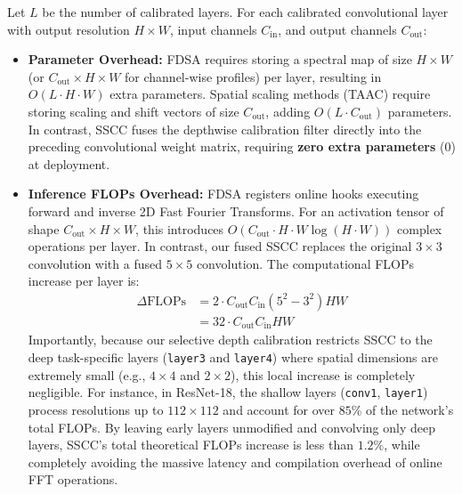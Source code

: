 \documentclass{article}
\theoremstyle{plain}
\theoremstyle{definition}
\theoremstyle{remark}
\begin{document}
Let $L$ be the number of calibrated layers. For each calibrated convolutional layer with output resolution $H \times W$, input channels $C_{\text{in}}$, and output channels $C_{\text{out}}$:
\begin{itemize}
    \item \textbf{Parameter Overhead:} FDSA requires storing a spectral map of size $H \times W$ (or $C_{\text{out}} \times H \times W$ for channel-wise profiles) per layer, resulting in $O(L \cdot H \cdot W)$ extra parameters. Spatial scaling methods (TAAC) require storing scaling and shift vectors of size $C_{\text{out}}$, adding $O(L \cdot C_{\text{out}})$ parameters. In contrast, SSCC fuses the depthwise calibration filter directly into the preceding convolutional weight matrix, requiring \textbf{zero extra parameters} ($0$) at deployment.
    \item \textbf{Inference FLOPs Overhead:} FDSA registers online hooks executing forward and inverse 2D Fast Fourier Transforms. For an activation tensor of shape $C_{\text{out}} \times H \times W$, this introduces $O(C_{\text{out}} \cdot H \cdot W \log(H \cdot W))$ complex operations per layer. In contrast, our fused SSCC replaces the original $3 \times 3$ convolution with a fused $5 \times 5$ convolution. The computational FLOPs increase per layer is:
    \begin{align}
        \Delta \text{FLOPs} &= 2 \cdot C_{\text{out}} C_{\text{in}} (5^2 - 3^2) H W \nonumber \\
        &= 32 \cdot C_{\text{out}} C_{\text{in}} H W
    \end{align}
    Importantly, because our selective depth calibration restricts SSCC to the deep task-specific layers (\texttt{layer3} and \texttt{layer4}) where spatial dimensions are extremely small (e.g., $4 \times 4$ and $2 \times 2$), this local increase is completely negligible. For instance, in ResNet-18, the shallow layers (\texttt{conv1}, \texttt{layer1}) process resolutions up to $112 \times 112$ and account for over $85\%$ of the network's total FLOPs. By leaving early layers unmodified and convolving only deep layers, SSCC's total theoretical FLOPs increase is less than $1.2\%$, while completely avoiding the massive latency and compilation overhead of online FFT operations.
\end{itemize}
\end{document}
